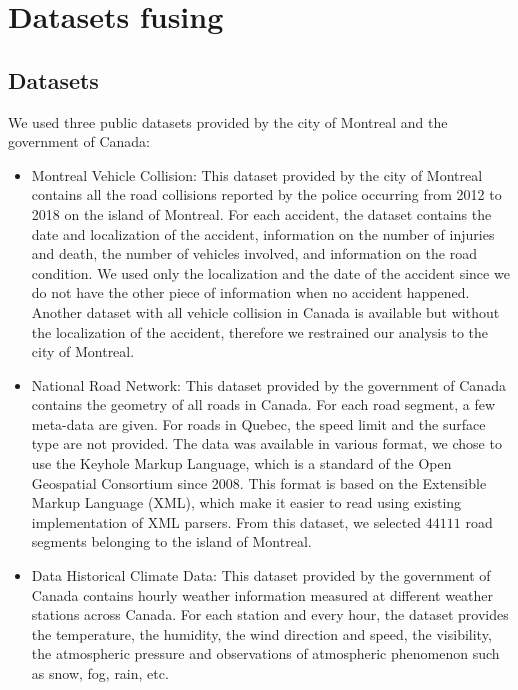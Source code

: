 \documentclass[conference]{IEEEtran}
\begin{document}
\section{Datasets fusing}
\subsection{Datasets}
We used three public datasets provided by the city of Montreal and the government of Canada: 
\begin{itemize}
\item Montreal Vehicle Collision: This dataset provided by the city of Montreal contains all the road collisions reported by the police occurring from 2012 to 2018 on the island of Montreal.
For each accident, the dataset contains the date and localization of the accident, information on the number of injuries and death, the number of vehicles involved, and information on the road condition.
We used only the localization and the date of the accident since we do not have the other piece of information when no accident happened.
Another dataset with all vehicle collision in Canada is available but without the localization of the accident, therefore we restrained our analysis to the city of Montreal.
\item National Road Network: This dataset provided by the government of Canada contains the geometry of all roads in Canada.
For each road segment, a few meta-data are given.
For roads in Quebec, the speed limit and the surface type are not provided.
The data was available in various format, we chose to use the Keyhole Markup Language, which is a standard of the Open Geospatial Consortium since 2008.
This format is based on the Extensible Markup Language (XML), which make it easier to read using existing implementation of XML parsers. From this dataset, we selected $44111$ road segments belonging to the island of Montreal.

\item Data Historical Climate Data: This dataset provided by the government of Canada contains hourly weather information measured at different weather stations across Canada.
For each station and every hour, the dataset provides the temperature, the humidity, the wind direction and speed, the visibility, the atmospheric pressure and observations of atmospheric phenomenon such as snow, fog, rain, etc.
\end{itemize}
\end{document}

